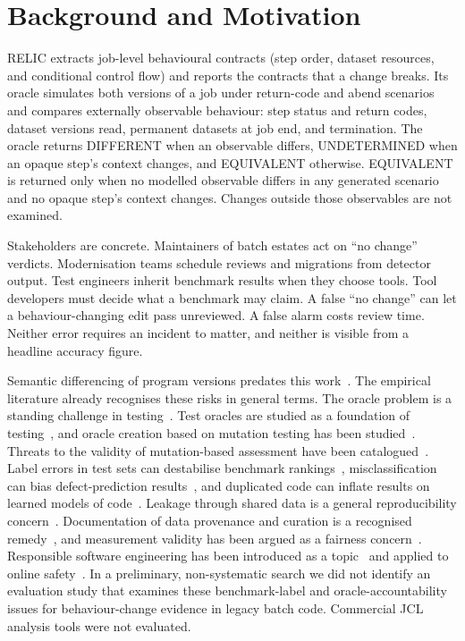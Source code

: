 \documentclass[conference]{IEEEtran}
\begin{document}
\section{Background and Motivation}
RELIC extracts job-level behavioural contracts (step order, dataset resources, and conditional control flow) and reports the contracts that a change breaks. Its oracle simulates both versions of a job under return-code and abend scenarios and compares externally observable behaviour: step status and return codes, dataset versions read, permanent datasets at job end, and termination. The oracle returns DIFFERENT when an observable differs, UNDETERMINED when an opaque step's context changes, and EQUIVALENT otherwise. EQUIVALENT is returned only when no modelled observable differs in any generated scenario and no opaque step's context changes. Changes outside those observables are not examined.

Stakeholders are concrete. Maintainers of batch estates act on ``no change'' verdicts. Modernisation teams schedule reviews and migrations from detector output. Test engineers inherit benchmark results when they choose tools. Tool developers must decide what a benchmark may claim. A false ``no change'' can let a behaviour-changing edit pass unreviewed. A false alarm costs review time. Neither error requires an incident to matter, and neither is visible from a headline accuracy figure.

Semantic differencing of program versions predates this work~\cite{jackson1994}. The empirical literature already recognises these risks in general terms. The oracle problem is a standing challenge in testing~\cite{barr2015}. Test oracles are studied as a foundation of testing~\cite{staats2011}, and oracle creation based on mutation testing has been studied~\cite{staats2012}. Threats to the validity of mutation-based assessment have been catalogued~\cite{papadakis2016}. Label errors in test sets can destabilise benchmark rankings~\cite{northcutt2021}, misclassification can bias defect-prediction results~\cite{herzig2013}, and duplicated code can inflate results on learned models of code~\cite{allamanis2019}. Leakage through shared data is a general reproducibility concern~\cite{kapoor2023}. Documentation of data provenance and curation is a recognised remedy~\cite{gebru2021}, and measurement validity has been argued as a fairness concern~\cite{jacobs2021}. Responsible software engineering has been introduced as a topic~\cite{schieferdecker2019} and applied to online safety~\cite{zhang2025}. In a preliminary, non-systematic search we did not identify an evaluation study that examines these benchmark-label and oracle-accountability issues for behaviour-change evidence in legacy batch code. Commercial JCL analysis tools were not evaluated.
\end{document}
